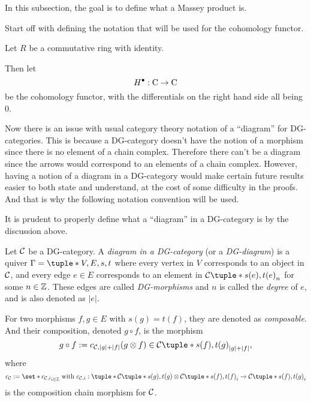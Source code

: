 In this subsection, the goal is to define what a Massey product is.

Start off with defining the notation that will be used for the cohomology functor.

\begin{notation}
    Let \( R \) be a commutative ring with identity.

    Then let
    \[
        H^\bullet: \operatorname{C} \to \operatorname{C}
    \]
    be the cohomology functor, with the differentials on the right hand side all being \( 0 \).
\end{notation}

Now there is an issue with usual category theory notation of a ``diagram'' for DG-categories. This is because a DG-category doesn't have the notion of a morphism since there is no element of a chain complex. Therefore there can't be a diagram since the arrows would correspond to an elements of a chain complex. However, having a notion of a diagram in a DG-category would make certain future results easier to both state and understand, at the cost of some difficulty in the proofs. And that is why the following notation convention will be used.

\begin{notation}
    It is prudent to properly define what a ``diagram'' in a DG-category is by the discussion above.

    Let \( {\mathcal{C}} \) be a DG-category. A \emph{diagram in a DG-category} (or a \emph{DG-diagram}) is a quiver \( \Gamma = \tuple*{V, E, s, t} \) where every vertex in \( V \) corresponds to an object in \( {\mathcal{C}} \), and every edge \( e \in E \) corresponds to an element in \( \Cc\tuple*{s(e), t(e)}_n \) for some \( n \in {\mathbb{Z}} \). These edges are called \emph{DG-morphisms} and \( n \) is called the \emph{degree} of \( e \), and is also denoted as \( |e| \).

    For two morphisms \( f, g \in E \) with \( s(g) = t(f) \), they are denoted as \emph{composable}. And their composition, denoted \( g \circ f \), is the morphism
    \[
        g \circ f := c_{\Cc, |g| + |f|}(g \otimes f) \in \Cc\tuple*{s(f), t(g)}_{|g| + |f|},
    \]
    where
    \[
        c_{\Cc} := \set*{c_{\Cc, i}}_{i \in \Zb} \text{ with } c_{\Cc, i}: \tuple*{ \Cc\tuple*{s(g), t(g)} \otimes \Cc\tuple*{s(f), t(f)} }_i \to \Cc\tuple*{s(f), t(g)}_i
    \]
    is the composition chain morphism for \( {\mathcal{C}} \).
\end{notation}


